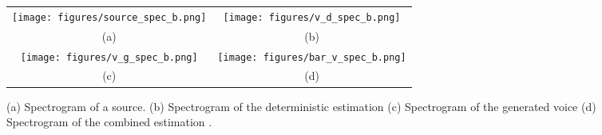 \documentclass{article}
\theoremstyle{plain}
\theoremstyle{definition}
\theoremstyle{remark}
\begin{document}
\begin{figure*}[t]
\centering
  \begin{tabular}{cc}
     \texttt{[image: figures/source\_spec\_b.png]}&
     \texttt{[image: figures/v\_d\_spec\_b.png]}\\
     (a)&(b)\\
     \texttt{[image: figures/v\_g\_spec\_b.png]}&
     \texttt{[image: figures/bar\_v\_spec\_b.png]}\\
     (c)&(d)
  \end{tabular}
    \caption{(a) Spectrogram of a source. (b) Spectrogram of the deterministic estimation  (c) Spectrogram of the generated voice  (d) Spectrogram of the combined estimation .}
    \label{fig:spec_graphs}
\end{figure*}
\end{document}
